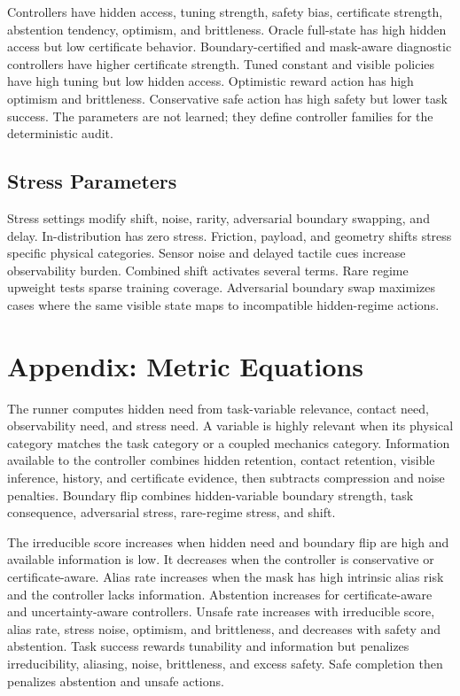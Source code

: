 \documentclass{article}
\begin{document}
Controllers have hidden access, tuning strength, safety bias, certificate
strength, abstention tendency, optimism, and brittleness. Oracle full-state has
high hidden access but low certificate behavior. Boundary-certified and
mask-aware diagnostic controllers have higher certificate strength. Tuned
constant and visible policies have high tuning but low hidden access. Optimistic
reward action has high optimism and brittleness. Conservative safe action has
high safety but lower task success. The parameters are not learned; they define
controller families for the deterministic audit.

\subsection{Stress Parameters}

Stress settings modify shift, noise, rarity, adversarial boundary swapping, and
delay. In-distribution has zero stress. Friction, payload, and geometry shifts
stress specific physical categories. Sensor noise and delayed tactile cues
increase observability burden. Combined shift activates several terms. Rare
regime upweight tests sparse training coverage. Adversarial boundary swap
maximizes cases where the same visible state maps to incompatible hidden-regime
actions.

\section{Appendix: Metric Equations}

The runner computes hidden need from task-variable relevance, contact need,
observability need, and stress need. A variable is highly relevant when its
physical category matches the task category or a coupled mechanics category.
Information available to the controller combines hidden retention, contact
retention, visible inference, history, and certificate evidence, then subtracts
compression and noise penalties. Boundary flip combines hidden-variable boundary
strength, task consequence, adversarial stress, rare-regime stress, and shift.

The irreducible score increases when hidden need and boundary flip are high and
available information is low. It decreases when the controller is conservative
or certificate-aware. Alias rate increases when the mask has high intrinsic alias
risk and the controller lacks information. Abstention increases for
certificate-aware and uncertainty-aware controllers. Unsafe rate increases with
irreducible score, alias rate, stress noise, optimism, and brittleness, and
decreases with safety and abstention. Task success rewards tunability and
information but penalizes irreducibility, aliasing, noise, brittleness, and
excess safety. Safe completion then penalizes abstention and unsafe actions.
\end{document}

